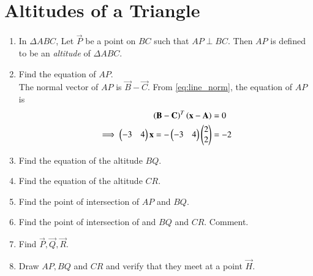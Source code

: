 \documentclass[journal,12pt,twocolumn]{IEEEtran}
\renewcommand\thesection{\arabic{section}}
\begin{document}
\section{Altitudes of a Triangle}
\begin{enumerate}[label=\thesection.\arabic*
,ref=\thesection.\theenumi]
\item
In $\Delta ABC$,  Let $\vec{P}$ be a point on $BC$ such that $AP \perp BC$.  Then $AP$ is defined to be 
an {\em altitude} of $\Delta ABC$.

\item
\label{prob:alt_eq}
Find the equation of $AP$.
\\
\solution The normal vector of $AP$ is $\vec{B} - \vec{C}$. From 
\eqref{eq:line_norm}, the equation of $AP$ is
\begin{align}
\label{eq:alt}
\left(\mathbf{B} - \mathbf{C}\right)^T\left(\mathbf{x} - \mathbf{A}\right)&= 0
\\
\implies \begin{pmatrix}-3&4\end{pmatrix}\mathbf{x} = -\begin{pmatrix}-3&4\end{pmatrix}\begin{pmatrix}2\\2\end{pmatrix} &= -2
\end{align}

%
%
\item Find the equation of the altitude $BQ$.

\item Find the equation of the altitude $CR$.
%
\item Find the point of intersection of $AP$ and $BQ$.
\item Find the point of intersection of  and $BQ$ and $CR$. Comment.
\item Find $\vec{P},\vec{Q},\vec{R}$.
%
\item Draw $AP, BQ$ and $CR$ and verify that they meet at a point 
$\vec{H}$.  

\end{enumerate}
\end{document}
